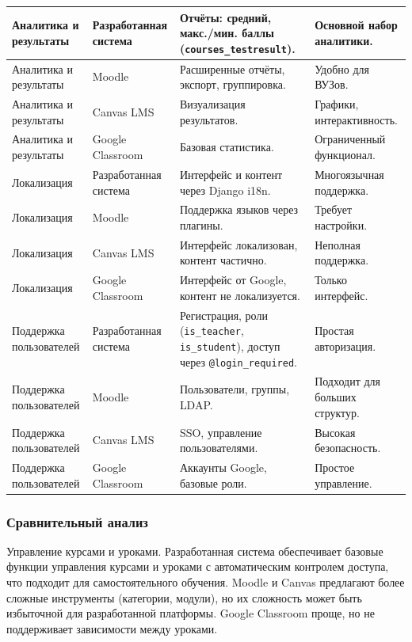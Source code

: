 \begin{xltabular}{\textwidth}{|p{3.1cm}|p{3.1cm}|p{3.5cm}|X|}
	Аналитика и результаты & Разработанная система & Отчёты: средний, макс./мин. баллы (\texttt{courses\_test\-result}). & Основной набор аналитики. \\ \hline
	Аналитика и результаты & Moodle & Расширенные отчёты, экспорт, группировка. & Удобно для ВУЗов. \\ \hline
	Аналитика и результаты & Canvas LMS & Визуализация результатов. & Графики, интерактивность. \\ \hline
	Аналитика и результаты & Google Classroom & Базовая статистика. & Ограниченный функционал. \\ \hline
	
	Локализация & Разработанная система & Интерфейс и контент через Django i18n. & Многоязычная поддержка. \\ \hline
	Локализация & Moodle & Поддержка языков через плагины. & Требует настройки. \\ \hline
	Локализация & Canvas LMS & Интерфейс локализован, контент частично. & Неполная поддержка. \\ \hline
	Локализация & Google Classroom & Интерфейс от Google, контент не локализуется. & Только интерфейс. \\ \hline
	
	Поддержка пользователей & Разработанная система & Регистрация, роли (\texttt{is\_teacher}, \texttt{is\_student}), доступ через \texttt{@login\_required}. & Простая авторизация. \\ \hline
	Поддержка пользователей & Moodle & Пользователи, группы, LDAP. & Подходит для больших структур. \\ \hline
	Поддержка пользователей & Canvas LMS & SSO, управление пользователями. & Высокая безопасность. \\ \hline
	Поддержка пользователей & Google Classroom & Аккаунты Google, базовые роли. & Простое управление. \\ \hline
\end{xltabular}




\subsubsection{Сравнительный анализ}

{Управление курсами и уроками.} Разработанная система обеспечивает базовые функции управления курсами и уроками с автоматическим контролем доступа, что подходит для самостоятельного обучения. Moodle и Canvas предлагают более сложные инструменты (категории, модули), но их сложность может быть избыточной для разработанной платформы. Google Classroom проще, но не поддерживает зависимости между уроками.

